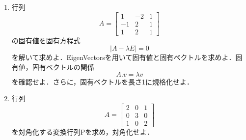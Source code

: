 \begin{enumerate}
\item
行列
\begin{equation*}
A= \left[ \begin {array}{ccc} 1&-2&1\\  -1&2&1\\  1&2&1\end {array} \right]
\end{equation*}
の固有値を固有方程式
\begin{equation*}
\left| A-\lambda E \right| =0
\end{equation*}
を解いて求めよ．EigenVectorsを用いて固有値と固有ベクトルを求めよ．固有値，固有ベクトルの関係
\begin{equation*}
A.v  =\lambda v
\end{equation*}
を確認せよ．さらに，固有ベクトルを長さ1に規格化せよ．

\item
行列
\begin{equation*}
A= \left[ \begin {array}{ccc} 2&0&1\\  0&3&0\\  1&0&2\end {array} \right]
\end{equation*}
を対角化する変換行列Pを求め，対角化せよ．
\end{enumerate}